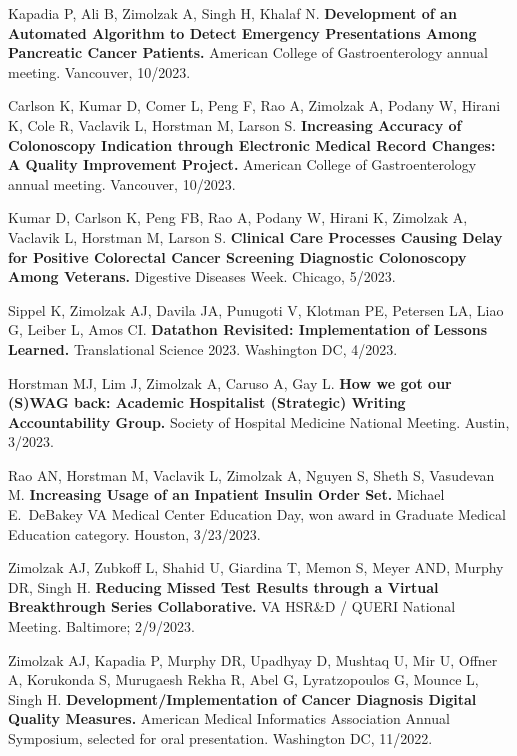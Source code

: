 \documentclass[10pt]{article}
\begin{document}

Kapadia P, Ali B, Zimolzak A, Singh H, Khalaf N. \textbf{Development
  of an Automated Algorithm to Detect Emergency Presentations Among
  Pancreatic Cancer Patients.} American College of Gastroenterology
annual meeting. Vancouver, 10/2023.

Carlson K, Kumar D, Comer L, Peng F, Rao A, Zimolzak A, Podany W,
Hirani K, Cole R, Vaclavik L, Horstman M, Larson S. \textbf{Increasing
  Accuracy of Colonoscopy Indication through Electronic Medical Record
  Changes: A Quality Improvement Project.} American College of
Gastroenterology annual meeting. Vancouver, 10/2023.


Kumar D, Carlson K, Peng FB, Rao A, Podany W, Hirani K, Zimolzak A,
Vaclavik L, Horstman M, Larson S. \textbf{Clinical Care Processes
  Causing Delay for Positive Colorectal Cancer Screening Diagnostic
  Colonoscopy Among Veterans.} Digestive Diseases Week. Chicago,
5/2023.

Sippel K, Zimolzak AJ, Davila JA, Punugoti V, Klotman PE, Petersen LA,
Liao G, Leiber L, Amos CI. \textbf{Datathon Revisited: Implementation
  of Lessons Learned.} Translational Science 2023. Washington DC,
4/2023.

Horstman MJ, Lim J, Zimolzak A, Caruso A, Gay L. \textbf{How we got
  our (S)WAG back: Academic Hospitalist (Strategic) Writing
  Accountability Group.} Society of Hospital Medicine National
Meeting. Austin, 3/2023.

Rao AN, Horstman M, Vaclavik L, Zimolzak A, Nguyen S, Sheth S,
Vasudevan M. \textbf{Increasing Usage of an Inpatient Insulin Order
  Set.} Michael E.\ DeBakey VA Medical Center Education Day, won award
in Graduate Medical Education category. Houston, 3/23/2023.

Zimolzak AJ, Zubkoff L, Shahid U, Giardina T, Memon S, Meyer AND,
Murphy DR, Singh H. \textbf{Reducing Missed Test Results through a
  Virtual Breakthrough Series Collaborative.} VA HSR\&D / QUERI
National Meeting. Baltimore; 2/9/2023.


Zimolzak AJ, Kapadia P, Murphy DR, Upadhyay D, Mushtaq U, Mir U,
Offner A, Korukonda S, Murugaesh Rekha R, Abel G, Lyratzopoulos G,
Mounce L, Singh H. \textbf{Development/Implementation of Cancer
  Diagnosis Digital Quality Measures.} American Medical Informatics
Association Annual Symposium, selected for oral presentation.
Washington DC, 11/2022.
\end{document}
